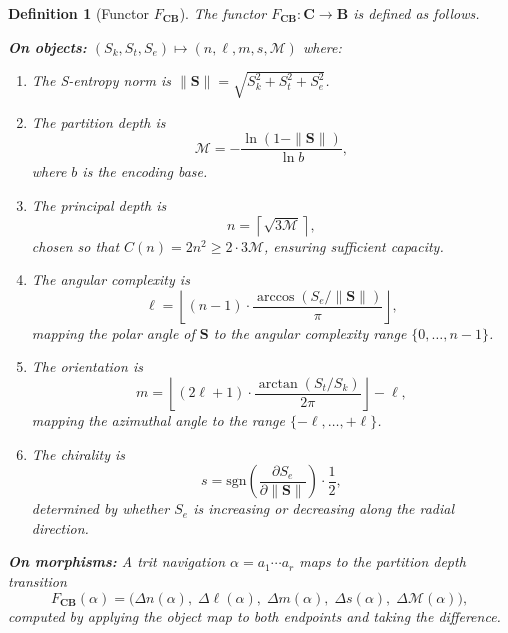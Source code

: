 \documentclass[twocolumn,10pt]{article}
\newtheorem{definition}[theorem]{Definition}
\theoremstyle{remark}
\newcommand{\Depth}{\mathcal{M}}
\newcommand{\Sk}{S_k}
\newcommand{\St}{S_t}
\newcommand{\Se}{S_e}
\newcommand{\Scoord}{\mathbf{S}}
\newcommand{\CatC}{\mathbf{C}}
\newcommand{\CatB}{\mathbf{B}}
\newcommand{\Fcb}{F_{\CatC\CatB}}
\begin{document}
\begin{definition}[Functor $\Fcb$]
\label{def:Fcb}
The functor $\Fcb: \CatC \to \CatB$ is defined as follows.

\textbf{On objects:} $(\Sk, \St, \Se) \mapsto (n, \ell, m, s, \Depth)$ where:
\begin{enumerate}[label=(\roman*)]
    \item The S-entropy norm is $\|\Scoord\| = \sqrt{\Sk^2 + \St^2 + \Se^2}$.
    \item The partition depth is
    \begin{equation}
    \Depth = -\frac{\ln(1 - \|\Scoord\|)}{\ln b},
    \label{eq:Fcb_depth}
    \end{equation}
    where $b$ is the encoding base.
    \item The principal depth is
    \begin{equation}
    n = \left\lceil \sqrt{3\Depth} \right\rceil,
    \label{eq:Fcb_n}
    \end{equation}
    chosen so that $C(n) = 2n^2 \geq 2 \cdot 3\Depth$, ensuring sufficient capacity.
    \item The angular complexity is
    \begin{equation}
    \ell = \left\lfloor (n-1) \cdot \frac{\arccos(\Se/\|\Scoord\|)}{\pi} \right\rfloor,
    \label{eq:Fcb_ell}
    \end{equation}
    mapping the polar angle of $\Scoord$ to the angular complexity range $\{0,\ldots,n-1\}$.
    \item The orientation is
    \begin{equation}
    m = \left\lfloor (2\ell+1) \cdot \frac{\arctan(\St/\Sk)}{2\pi} \right\rfloor - \ell,
    \label{eq:Fcb_m}
    \end{equation}
    mapping the azimuthal angle to the range $\{-\ell,\ldots,+\ell\}$.
    \item The chirality is
    \begin{equation}
    s = \mathrm{sgn}\!\left(\frac{\partial \Se}{\partial \|\Scoord\|}\right) \cdot \frac{1}{2},
    \label{eq:Fcb_s}
    \end{equation}
    determined by whether $\Se$ is increasing or decreasing along the radial direction.
\end{enumerate}

\textbf{On morphisms:} A trit navigation $\alpha = a_1 \cdots a_r$ maps to the partition depth transition
\begin{equation}
\Fcb(\alpha) = \bigl(\Delta n(\alpha),\; \Delta\ell(\alpha),\; \Delta m(\alpha),\; \Delta s(\alpha),\; \Delta\Depth(\alpha)\bigr),
\end{equation}
computed by applying the object map to both endpoints and taking the difference.
\end{definition}
\end{document}
